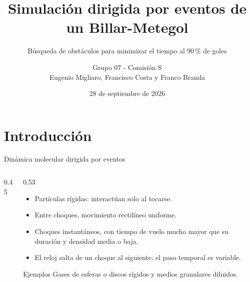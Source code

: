 \documentclass[aspectratio=169,11pt]{beamer}
\title[Billar-Metegol]{Simulación dirigida por eventos de un Billar-Metegol}
\subtitle{Búsqueda de obstáculos para minimizar el tiempo al 90\,\% de goles}
\author[Grupo 07]{Grupo 07 - Comisión S\\Eugenio Migliaro, Francisco Costa y Franco Branda}
\institute{72.25 Simulación de Sistemas - ITBA}
\date{28 de septiembre de 2026}
\begin{document}
\begin{frame}
  \titlepage
\end{frame}

\section{Introducción}
\begin{frame}
  \sectionpage
\end{frame}

\begin{frame}{Dinámica molecular dirigida por eventos}
  \begin{columns}[c,onlytextwidth]
    \begin{column}{0.45\textwidth}
      \centering
    \end{column}
    \begin{column}{0.53\textwidth}
      \begin{itemize}
        \item Partículas rígidas: interactúan solo al tocarse.
        \item Entre choques, movimiento rectilíneo uniforme.
        \item Choques instantáneos, con tiempo de vuelo mucho mayor que su duración y densidad media o baja.
        \item El reloj salta de un choque al siguiente: el paso temporal es variable.
      \end{itemize}
      \begin{block}{Ejemplos}
        Gases de esferas o discos rígidos y medios granulares diluidos.
      \end{block}
    \end{column}
  \end{columns}
\end{frame}
\end{document}
